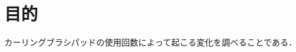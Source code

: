 \documentclass[main]{subfiles}
\begin{document}
\chapter{目的}
カーリングブラシパッドの使用回数によって起こる変化を調べることである．
\end{document}
